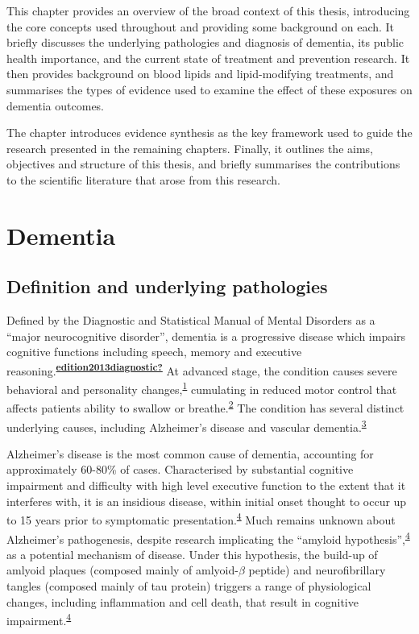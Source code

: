 \documentclass[a4paper, twoside]{templates/ociamthesis}
\begin{document}
This chapter provides an overview of the broad context of this thesis, introducing the core concepts used throughout and providing some background on each. It briefly discusses the underlying pathologies and diagnosis of dementia, its public health importance, and the current state of treatment and prevention research. It then provides background on blood lipids and lipid-modifying treatments, and summarises the types of evidence used to examine the effect of these exposures on dementia outcomes.

The chapter introduces evidence synthesis as the key framework used to guide the research presented in the remaining chapters. Finally, it outlines the aims, objectives and structure of this thesis, and briefly summarises the contributions to the scientific literature that arose from this research.

\hypertarget{dementia}{%
\section{Dementia}\label{dementia}}

\hypertarget{underlying-pathologies}{%
\subsection{Definition and underlying pathologies}\label{underlying-pathologies}}

Defined by the Diagnostic and Statistical Manual of Mental Disorders as a ``major neurocognitive disorder'', dementia is a progressive disease which impairs cognitive functions including speech, memory and executive reasoning.\textsuperscript{\protect\hyperlink{ref-edition2013diagnostic}{\textbf{edition2013diagnostic?}}} At advanced stage, the condition causes severe behavioral and personality changes,\textsuperscript{\protect\hyperlink{ref-cerejeira2012}{1}} cumulating in reduced motor control that affects patients ability to swallow or breathe.\textsuperscript{\protect\hyperlink{ref-kumar2013}{2}} The condition has several distinct underlying causes, including Alzheimer's disease and vascular dementia.\textsuperscript{\protect\hyperlink{ref-burns2009}{3}}

Alzheimer's disease is the most common cause of dementia, accounting for approximately 60-80\% of cases. Characterised by substantial cognitive impairment and difficulty with high level executive function to the extent that it interferes with, it is an insidious disease, within initial onset thought to occur up to 15 years prior to symptomatic presentation.\textsuperscript{\protect\hyperlink{ref-robinson2015}{4}} Much remains unknown about Alzheimer's pathogenesis, despite research implicating the ``amyloid hypothesis'',\textsuperscript{\protect\hyperlink{ref-robinson2015}{4}} as a potential mechanism of disease. Under this hypothesis, the build-up of amlyoid plaques (composed mainly of amlyoid-\(\beta\) peptide) and neurofibrillary tangles (composed mainly of tau protein) triggers a range of physiological changes, including inflammation and cell death, that result in cognitive impairment.\textsuperscript{\protect\hyperlink{ref-robinson2015}{4}}
\end{document}
